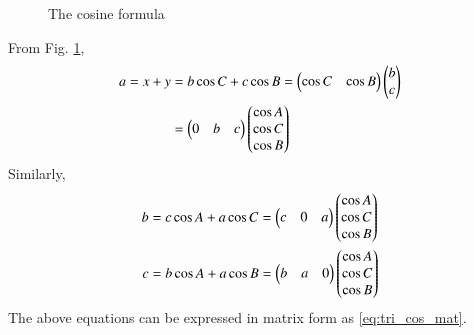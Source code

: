 \begin{enumerate}[label=\thesubsection.\arabic*.,ref=\thesubsection.\theenumi]
\begin{figure}[!ht]
\begin{center}
		\resizebox{0.6\columnwidth}{!}{}
	\end{center}
	\caption{The cosine formula}
	\label{fig:tri_cosine_formula}	
\end{figure}
\solution From Fig. \ref{fig:tri_cosine_formula}, 
%
\begin{align}
	a = x + y &= b \cos C + c \cos B = \begin{pmatrix}  \cos C & \cos B \end{pmatrix} \begin{pmatrix} b \\ c \end{pmatrix}
	\\
&=\begin{pmatrix}0 & b & c \end{pmatrix} \begin{pmatrix} \cos A \\ \cos C \\ \cos B \end{pmatrix} 
\end{align}
%
Similarly,
%
\begin{align}
b &= c \cos A + a \cos C 
=\begin{pmatrix}c & 0 & a \end{pmatrix} \begin{pmatrix} \cos A \\ \cos C \\ \cos B \end{pmatrix} 
	\\
c &= b \cos A + a \cos B
=\begin{pmatrix}b & a & 0 \end{pmatrix} \begin{pmatrix} \cos A \\ \cos C \\ \cos B \end{pmatrix} 
\end{align}
%
The above equations can be expressed in matrix form as
\eqref{eq:tri_cos_mat}.


\end{enumerate}
